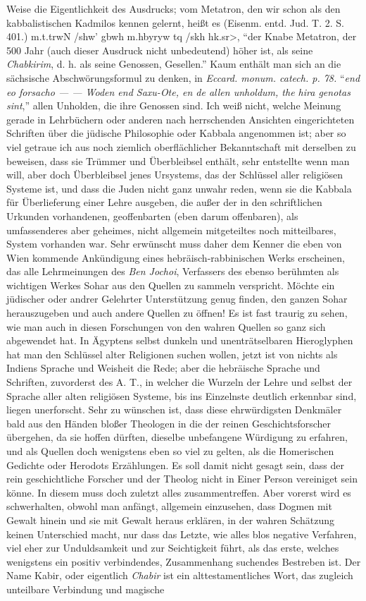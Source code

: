 \documentclass[a4paper, 11pt, oneside]{article}
\begin{document}
Weise die Eigentlichkeit des Ausdrucks; vom Metatron, den wir schon als den kabbalistischen Kadmilos kennen gelernt, heißt es (Eisenm. entd. Jud. T. 2. S. 401.) \foreignlanguage{hebrew}{\<m.t.trwN /shw' gbwh m.hbyryw tq /skh hk.sr>}, "`der Knabe Metatron, der 500 Jahr (auch dieser Ausdruck nicht unbedeutend) höher ist, als seine \emph{Chabkirim}, d. h. als seine Genossen, Gesellen."' Kaum enthält man sich an die sächsische Abschwörungsformul zu denken, in \emph{Eccard. monum. catech. p. 78.} "`\emph{end eo forsacho --- --- Woden end Saxu-Ote, en de allen unholdum, the hira genotas sint},"' allen Unholden, die ihre Genossen sind. Ich weiß nicht, welche Meinung gerade in Lehrbüchern oder anderen nach herrschenden Ansichten eingerichteten Schriften über die jüdische Philosophie oder Kabbala angenommen ist; aber so viel getraue ich aus noch ziemlich oberflächlicher Bekanntschaft mit derselben zu beweisen, dass sie Trümmer und Überbleibsel enthält, sehr entstellte wenn man will, aber doch Überbleibsel jenes Ursystems, das der Schlüssel aller religiösen Systeme ist, und dass die Juden nicht ganz unwahr reden, wenn sie die Kabbala für Überlieferung einer Lehre ausgeben, die außer der in den schriftlichen Urkunden vorhandenen, geoffenbarten (eben darum offenbaren), als umfassenderes aber geheimes, nicht allgemein mitgeteiltes noch mitteilbares, System vorhanden war. Sehr erwünscht muss daher dem Kenner die eben von Wien kommende Ankündigung eines hebräisch-rabbinischen Werks erscheinen, das alle Lehrmeinungen des \emph{Ben Jochoi}, Verfassers des ebenso berühmten als wichtigen Werkes Sohar aus den Quellen zu sammeln verspricht. Möchte ein jüdischer oder andrer Gelehrter Unterstützung genug finden, den ganzen Sohar herauszugeben und auch andere Quellen zu öffnen! Es ist fast traurig zu sehen, wie man auch in diesen Forschungen von den wahren Quellen so ganz sich abgewendet hat. In Ägyptens selbst dunkeln und unenträtselbaren Hieroglyphen hat man den Schlüssel alter Religionen suchen wollen, jetzt ist von nichts als Indiens Sprache und Weisheit die Rede; aber die hebräische Sprache und Schriften, zuvorderst des A. T., in welcher die Wurzeln der Lehre und selbst der Sprache aller alten religiösen Systeme, bis ins Einzelnste deutlich erkennbar sind, liegen unerforscht. Sehr zu wünschen ist, dass diese ehrwürdigsten Denkmäler bald aus den Händen bloßer Theologen in die der reinen Geschichtsforscher übergehen, da sie hoffen dürften, dieselbe unbefangene Würdigung zu erfahren, und als Quellen doch wenigstens eben so viel zu gelten, als die Homerischen Gedichte oder Herodots Erzählungen. Es soll damit nicht gesagt sein, dass der rein geschichtliche Forscher und der Theolog nicht in Einer Person vereiniget sein könne. In diesem muss doch zuletzt alles zusammentreffen. Aber vorerst wird es schwerhalten, obwohl man anfängt, allgemein einzusehen, dass Dogmen mit Gewalt hinein und sie mit Gewalt heraus erklären, in der wahren Schätzung keinen Unterschied macht, nur dass das Letzte, wie alles blos negative Verfahren, viel eher zur Unduldsamkeit und zur Seichtigkeit führt, als das erste, welches wenigstens ein positiv verbindendes, Zusammenhang suchendes Bestreben ist. Der Name Kabir, oder eigentlich \emph{Chabir} ist ein alttestamentliches Wort, das zugleich unteilbare Verbindung und magische 
\end{document}
